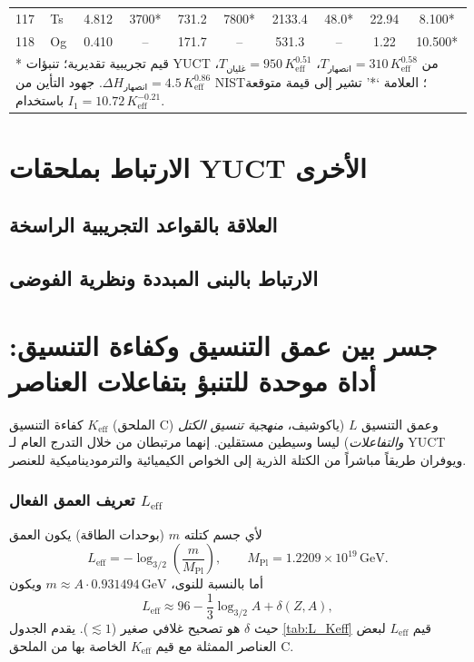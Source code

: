 \documentclass[11pt,a4paper]{article}
\begin{document}
\begin{english}
\begin{longtable}{@{}llcccccccc@{}}
			117& Ts  & 4.812 & 3700*  & 731.2  & 7800*  & 2133.4 & 48.0* & 22.94 & 8.100* \\
			118& Og  & 0.410 & --     & 171.7  & --     & 531.3  & --    & 1.22  & 10.500* \\
			\bottomrule
			\multicolumn{10}{p{0.9\textwidth}}{\footnotesize
				* قيم تجريبية تقديرية؛ تنبؤات YUCT من \(T_{\text{انصهار}}=310\,K_{\mathrm{eff}}^{0.58}\)، 
				\(T_{\text{غليان}}=950\,K_{\mathrm{eff}}^{0.51}\)، 
				\(\Delta H_{\text{انصهار}}=4.5\,K_{\mathrm{eff}}^{0.86}\).  
				جهود التأين من NIST؛ العلامة `*' تشير إلى قيمة متوقعة باستخدام \(I_1 = 10.72\,K_{\mathrm{eff}}^{-0.21}\).}
		\end{longtable}
	\end{english}
	
	\section{الارتباط بملحقات YUCT الأخرى}
	\subsection{العلاقة بالقواعد التجريبية الراسخة}
	\subsection{الارتباط بالبنى المبددة ونظرية الفوضى}
	
	\section{جسر بين عمق التنسيق وكفاءة التنسيق: أداة موحدة للتنبؤ بتفاعلات العناصر}
	\label{subsec:bridge}
	
	كفاءة التنسيق \(K_{\mathrm{eff}}\) (الملحق C) وعمق التنسيق \(L\) (ياكوشيف، \textit{منهجية تنسيق الكتل والتفاعلات}\cite{YKmass}) ليسا وسيطين مستقلين.  
	إنهما مرتبطان من خلال التدرج العام لـ YUCT ويوفران طريقاً مباشراً من الكتلة الذرية إلى الخواص الكيميائية والترموديناميكية للعنصر.
	
	\subsubsection{تعريف العمق الفعال \(L_{\mathrm{eff}}\)}
	لأي جسم كتلته \(m\) (بوحدات الطاقة) يكون العمق
	\begin{equation}
		L_{\mathrm{eff}} = -\log_{3/2}\!\left(\frac{m}{M_{\mathrm{Pl}}}\right),
		\qquad M_{\mathrm{Pl}} = 1.2209\times10^{19}\,\text{GeV}.
	\end{equation}
	أما بالنسبة للنوى، \(m \approx A \cdot 0.931494\,\text{GeV}\) ويكون
	\begin{equation}
		L_{\mathrm{eff}} \approx 96 - \frac{1}{3}\log_{3/2}A + \delta(Z,A),
	\end{equation}
	حيث \(\delta\) هو تصحيح غلافي صغير (\(\lesssim 1\)).  
	يقدم الجدول \ref{tab:L_Keff} قيم \(L_{\mathrm{eff}}\) لبعض العناصر الممثلة مع قيم \(K_{\mathrm{eff}}\) الخاصة بها من الملحق C.
	
\end{document}
